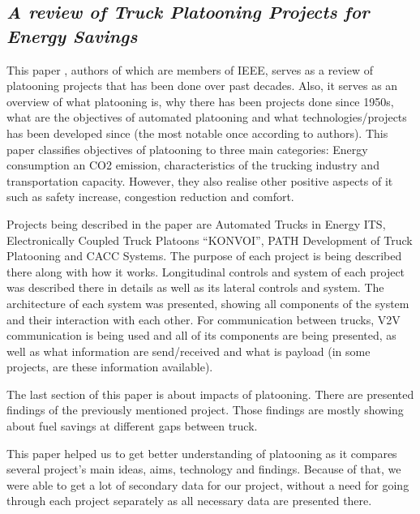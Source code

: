 \subsection{\textit{A review of Truck Platooning Projects for Energy Savings}}

This paper \cite{Tsugawa2016ASavings}, authors of which are members of IEEE, serves as a review of platooning projects that has been done over past decades. Also, it serves as an overview of what platooning is, why there has been projects done since 1950s, what are the objectives of automated platooning and what technologies/projects has been developed since (the most notable once according to authors).
This paper classifies objectives of platooning to three main categories: Energy consumption an CO2 emission, characteristics of the trucking industry and transportation capacity. However, they also realise other positive aspects of it such as safety increase, congestion reduction and comfort.\par
% 
Projects being described in the paper are Automated Trucks in Energy ITS, Electronically Coupled Truck Platoons “KONVOI”, PATH Development of Truck Platooning and CACC Systems. The purpose of each project is being described there along with how it works. Longitudinal controls and system of each project was described there in details as well as its lateral controls and system. The architecture of each system was presented, showing all components of the system and their interaction with each other. For communication between trucks, V2V communication is being used and all of its components are being presented, as well as what information are send/received and what is payload (in some projects, are these information available).\par
% 
The last section of this paper is about impacts of platooning. There are presented findings of the previously mentioned project. Those findings are mostly showing about fuel savings at different gaps between truck.\par
% 
This paper helped us to get better understanding of platooning as it compares several project’s main ideas, aims, technology and findings. Because of that, we were able to get a lot of secondary data for our project, without a need for going through each project separately as all necessary data are presented there.
